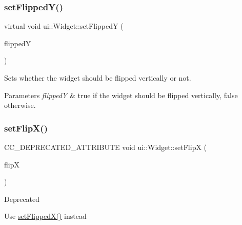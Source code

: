 \subsubsection{\texorpdfstring{set\+Flipped\+Y()}{setFlippedY()}\hspace{0.1cm}{\footnotesize\ttfamily [2/2]}}
{\footnotesize\ttfamily virtual void ui\+::\+Widget\+::set\+FlippedY (\begin{DoxyParamCaption}\item[{bool}]{flippedY }\end{DoxyParamCaption})\hspace{0.3cm}{\ttfamily [virtual]}}

Sets whether the widget should be flipped vertically or not.


\begin{DoxyParams}{Parameters}
{\em flippedY} & true if the widget should be flipped vertically, false otherwise. \\
\hline
\end{DoxyParams}
\mbox{\label{classui_1_1Widget_a0bcb34000f6bfc5d11ee5ab9ba3da08d}} 
\subsubsection{\texorpdfstring{set\+Flip\+X()}{setFlipX()}\hspace{0.1cm}{\footnotesize\ttfamily [1/2]}}
{\footnotesize\ttfamily C\+C\+\_\+\+D\+E\+P\+R\+E\+C\+A\+T\+E\+D\+\_\+\+A\+T\+T\+R\+I\+B\+U\+TE void ui\+::\+Widget\+::set\+FlipX (\begin{DoxyParamCaption}\item[{bool}]{flipX }\end{DoxyParamCaption})\hspace{0.3cm}{\ttfamily [inline]}}

\begin{DoxyRefDesc}{Deprecated}
\item[\hyperlink{deprecated__deprecated000173}{Deprecated}]Use \hyperlink{classui_1_1Widget_adeffb95b64ba85db92cc533457883194}{set\+Flipped\+X()} instead \end{DoxyRefDesc}
\mbox{\label{classui_1_1Widget_a0bcb34000f6bfc5d11ee5ab9ba3da08d}} 
